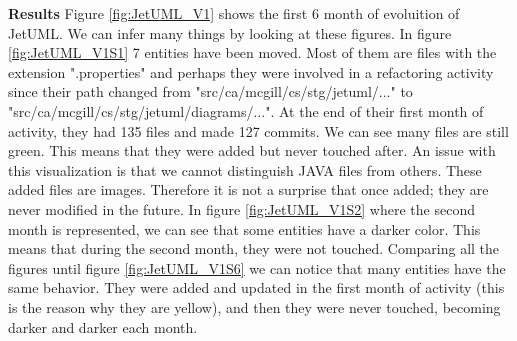 \textbf{Results}
Figure \ref{fig:JetUML_V1} shows the first 6 month of evoluition of JetUML. 
We can infer many things by looking at these figures. In figure \ref{fig:JetUML_V1S1} 7 entities have been moved. 
Most of them are files with the extension ".properties" and perhaps they were involved in a refactoring activity since their path changed from
"src/ca/mcgill/cs/stg/jetuml/..." to "src/ca/mcgill/cs/stg/jetuml/diagrams/...". 
At the end of their first month of activity, they had 135 files and made 127 commits. 
We can see many files are still green. This means that they were added but never touched after. 
An issue with this visualization is that we cannot distinguish JAVA files from others. 
These added files are images. Therefore it is not a surprise that once added; they are never modified in the future. 
In figure \ref{fig:JetUML_V1S2} where the second month is represented, we can see that some entities have a darker color. 
This means that during the second month, they were not touched. 
Comparing all the figures until figure \ref{fig:JetUML_V1S6} we can notice that many entities have the same behavior. 
They were added and updated in the first month of activity (this is the reason why they are yellow), and then they were never touched, becoming darker and darker each month. 

